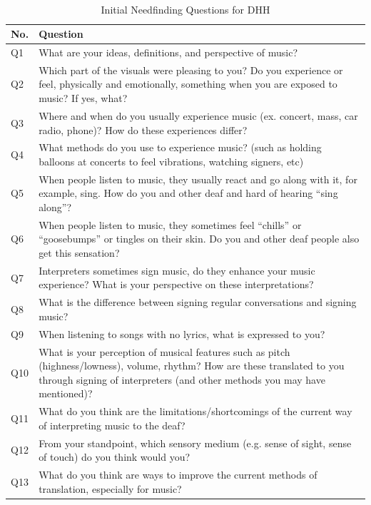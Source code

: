 \begin{table}
  \centering
  \caption{Initial Needfinding Questions for DHH}~\label{tab:needfinding}
  \addtolength{\tabcolsep}{2pt} 
  \begin{tabular}{p{.5cm}|p{7cm}}
  	\toprule
    \rule{0pt}{8pt}No. & Question \\[2pt]
    \toprule
    Q1 & What are your ideas, definitions, and perspective of music? \\
    Q2 & Which part of the visuals were pleasing to you? Do you experience or feel, physically and emotionally, something when you are exposed to music? If yes, what? \\
    Q3 & Where and when do you usually experience music (ex. concert, mass, car radio, phone)? How do these experiences differ? \\
    Q4 & What methods do you use to experience music? (such as holding balloons at concerts to feel vibrations, watching signers, etc) \\
	Q5 & When people listen to music, they usually react and go along with it, for example, sing. How do you and other deaf and hard of hearing ``sing along''? \\
	Q6 & When people listen to music, they sometimes feel ``chills'' or ``goosebumps'' or tingles on their skin. Do you and other deaf people also get this sensation? \\
	Q7 & Interpreters sometimes sign music, do they enhance your music experience? What is your perspective on these interpretations? \\
	Q8 & What is the difference between signing regular conversations and signing music? \\
	Q9 & When listening to songs with no lyrics, what is expressed to you? \\
	Q10 & What is your perception of musical features such as pitch (highness/lowness), volume, rhythm? How are these translated to you through signing of interpreters (and other methods you may have mentioned)? \\
	Q11 & What do you think are the limitations/shortcomings of the current way of interpreting music to the deaf? \\
	Q12 & From your standpoint, which sensory medium (e.g. sense of sight, sense of touch) do you think would you? \\
	Q13 & What do you think are ways to improve the current methods of translation, especially for music? \\ 
    \bottomrule
  \end{tabular}
  \addtolength{\tabcolsep}{-2pt} 
\end{table}



